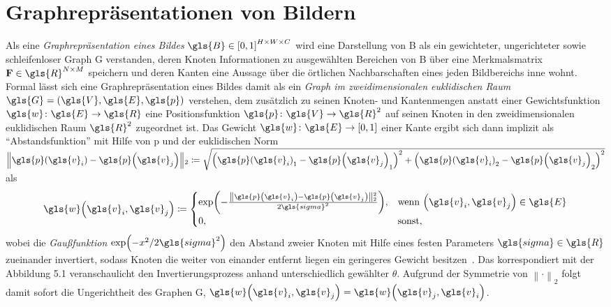 \chapter{Graphrepräsentationen von Bildern}
\label{graphrepraesentationen_von_bildern}

Als eine \emph{Graphrepräsentation eines Bildes} $\gls{B} \in {\left[0, 1\right]}^{H \times W \times C}$ wird eine Darstellung von \gls{B} als ein gewichteter, ungerichteter sowie schleifenloser Graph \gls{G} verstanden, deren Knoten Informationen zu ausgewählten Bereichen von \gls{B} über eine Merkmalsmatrix $\ma{F} \in \gls{R}^{N \times M}$ speichern und deren Kanten eine Aussage über die örtlichen Nachbarschaften eines jeden Bildbereichs inne wohnt.
Formal lässt sich eine Graphrepräsentation eines Bildes damit als ein \emph{Graph im zweidimensionalen euklidischen Raum} $\gls{G} = \left(\gls{V}, \gls{E}, \gls{p}\right)$ verstehen, dem zusätzlich zu seinen Knoten- und Kantenmengen anstatt einer Gewichtsfunktion $\gls{w} \colon \gls{E} \to \gls{R}$ eine Positionsfunktion $\gls{p} \colon \gls{V} \to \gls{R}^2$ auf seinen Knoten in den zweidimensionalen euklidischen Raum $\gls{R}^2$ zugeordnet ist.
Das Gewicht $\gls{w} \colon \gls{E} \to \left[0, 1\right]$ einer Kante ergibt sich dann implizit als \enquote{Abstandsfunktion} mit Hilfe von \gls{p} und der euklidischen Norm $\left\|\gls{p}\left(\gls{v}_i\right) - \gls{p}\left(\gls{v}_j\right) \right\|_2 \coloneqq \sqrt{{\left({\gls{p}\left(\gls{v}_i\right)}_1 - {\gls{p}\left(\gls{v}_j\right)}_1\right)}^2 + {\left({\gls{p}\left(\gls{v}_i\right)}_2 - {\gls{p}\left(\gls{v}_j\right)}_2\right)}^2}$ als
\begin{equation}
  \gls{w}\left(\gls{v}_i, \gls{v}_j\right) \coloneqq \begin{cases}
    \exp\left(-\frac{\left\|\gls{p}\left(\gls{v}_i\right) - \gls{p}\left(\gls{v}_j\right)\right\|_2^2}{2\gls{sigma}^2}\right), & \text{wenn }\left(\gls{v}_i, \gls{v}_j\right) \in \gls{E}\\
    0, & \text{sonst},
  \end{cases}
  \label{gauss}
\end{equation}
wobei die \emph{Gaußfunktion} $\exp\left(-x^2 / 2 \gls{sigma}^2\right)$ den Abstand zweier Knoten mit Hilfe eines festen Parameters $\gls{sigma} \in \gls{R}$ zueinander invertiert, sodass Knoten die weiter von einander entfernt liegen ein geringeres Gewicht besitzen~\cite{Shuman}.
Das korrespondiert mit der
Abbildung 5.1 veranschaulicht den Invertierungsprozess anhand unterschiedlich gewählter $\theta$.
Aufgrund der Symmetrie von ${\left\|\cdot\right\|}_2$ folgt damit sofort die Ungerichtheit des Graphen \gls{G}, \dhe{} $\gls{w}\left(\gls{v}_i, \gls{v}_j\right) = \gls{w}\left(\gls{v}_j, \gls{v}_i\right)$.

